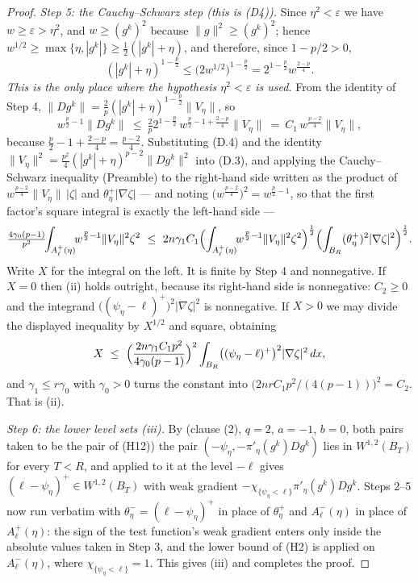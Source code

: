 \begin{proof}
\emph{Step 5: the Cauchy--Schwarz step (this is (D4)).}  Since
$\eta^2<\varepsilon$ we have $w\ge\varepsilon>\eta^2$, and $w\ge(g^k)^2$
because $\|g\|^2\ge(g^k)^2$; hence
$w^{1/2}\ge\max\{\eta,|g^k|\}\ge\tfrac12(|g^k|+\eta)$, and therefore, since
$1-p/2>0$,
\[
(|g^k|+\eta)^{1-\frac p2}\le\bigl(2w^{1/2}\bigr)^{1-\frac p2}
=2^{1-\frac p2}w^{\frac{2-p}4}.
\]
\emph{This is the only place where the hypothesis $\eta^2<\varepsilon$ is
used.}  From the identity of Step 4,
$\|Dg^k\|=\tfrac2p(|g^k|+\eta)^{1-\frac p2}\|V_\eta\|$, so
\[
w^{\frac p2-1}\|Dg^k\|\ \le\ \tfrac2p2^{1-\frac p2}\,
w^{\frac p2-1+\frac{2-p}4}\|V_\eta\|\ =\ C_1\,w^{\frac{p-2}4}\|V_\eta\| ,
\tag{D.4}
\]
because $\tfrac p2-1+\tfrac{2-p}4=\tfrac{p-2}4$.  Substituting (D.4) and the
identity $\|V_\eta\|^2=\tfrac{p^2}4(|g^k|+\eta)^{p-2}\|Dg^k\|^2$ into (D.3),
and applying the Cauchy--Schwarz inequality (Preamble) to the right-hand side
written as the product of $w^{\frac{p-2}4}\|V_\eta\|\,|\zeta|$ and
$\theta^+_\eta|\nabla\zeta|$ --- and noting
$\bigl(w^{\frac{p-2}4}\bigr)^2=w^{\frac p2-1}$, so that the first factor's
square integral is exactly the left-hand side ---
\[
\tfrac{4\gamma_0(p-1)}{p^2}\!\!\int_{A^+_\ell(\eta)}\!\!
w^{\frac p2-1}\|V_\eta\|^2\zeta^2
\ \le\ 2n\gamma_1C_1\Bigl(\int_{A^+_\ell(\eta)}\!\!
w^{\frac p2-1}\|V_\eta\|^2\zeta^2\Bigr)^{\frac12}
\Bigl(\int_{B_R}(\theta^+_\eta)^2|\nabla\zeta|^2\Bigr)^{\frac12}.
\]
Write $X$ for the integral on the left.  It is finite by Step 4 and
nonnegative.  If $X=0$ then (ii) holds outright, because its right-hand side is
nonnegative: $C_2\ge0$ and the integrand
$\bigl((\psi_\eta-\ell)^+\bigr)^2|\nabla\zeta|^2$ is nonnegative.  If $X>0$ we
may divide the displayed inequality by $X^{1/2}$ and square, obtaining
\[
X\ \le\ \Bigl(\frac{2n\gamma_1C_1p^2}{4\gamma_0(p-1)}\Bigr)^{2}
\int_{B_R}\bigl((\psi_\eta-\ell)^+\bigr)^2|\nabla\zeta|^2\,dx ,
\]
and $\gamma_1\le r\gamma_0$ with $\gamma_0>0$ turns the constant into
$\bigl(2nrC_1p^2/(4(p-1))\bigr)^2=C_2$.  That is (ii).

\emph{Step 6: the lower level sets (iii).}  By
 (clause (2), $q=2$, $a=-1$, $b=0$, both pairs
taken to be the pair of (H12)) the pair $(-\psi_\eta,-\pi'_\eta(g^k)Dg^k)$
lies in $W^{1,2}(B_T)$ for every $T<R$, and
 applied to it at the level $-\ell$ gives
$(\ell-\psi_\eta)^+\in W^{1,2}(B_T)$ with weak gradient
$-\chi_{\{\psi_\eta<\ell\}}\pi'_\eta(g^k)Dg^k$.  Steps 2--5 now run verbatim
with $\theta^-_\eta=(\ell-\psi_\eta)^+$ in place of $\theta^+_\eta$ and
$A^-_\ell(\eta)$ in place of $A^+_\ell(\eta)$: the sign of the test function's
weak gradient enters only inside the absolute values taken in Step 3, and the
lower bound of (H2) is applied on $A^-_\ell(\eta)$, where
$\chi_{\{\psi_\eta<\ell\}}=1$.  This gives (iii) and completes the proof.
\end{proof}
